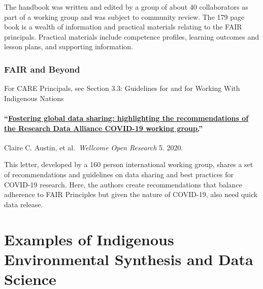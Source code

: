 \documentclass[
]{book}
\begin{document}
The handbook was written and edited by a group of about 40 collaborators as part of a working group and was subject to community review. The 179 page book is a wealth of information and practical materials relating to the FAIR principals. Practical materials include competence profiles, learning outcomes and lesson plans, and supporting information.

\hypertarget{fair-and-beyond}{%
\subsection{FAIR and Beyond}\label{fair-and-beyond}}

For CARE Principals, see Section 3.3: Guidelines for and for Working With Indigenous Nations

\hypertarget{fostering-global-data-sharing-highlighting-the-recommendations-of-the-research-data-alliance-covid-19-working-group.}{%
\subsubsection*{\texorpdfstring{``\href{https://www.ncbi.nlm.nih.gov/pmc/articles/PMC7808050/}{Fostering global data sharing: highlighting the recommendations of the Research Data Alliance COVID-19 working group.}''}{``Fostering global data sharing: highlighting the recommendations of the Research Data Alliance COVID-19 working group.''}}\label{fostering-global-data-sharing-highlighting-the-recommendations-of-the-research-data-alliance-covid-19-working-group.}}

Claire C. Austin, et al.~\emph{Wellcome Open Research} 5. 2020.

This letter, developed by a 160 person international working group, shares a set of recommendations and guidelines on data sharing and best practices for COVID-19 research. Here, the authors create recommendations that balance adherence to FAIR Principles but given the nature of COVID-19, also need quick data release.

\hypertarget{examples-of-indigenous-environmental-synthesis-and-data-science}{%
\chapter{Examples of Indigenous Environmental Synthesis and Data Science}\label{examples-of-indigenous-environmental-synthesis-and-data-science}}
\end{document}

